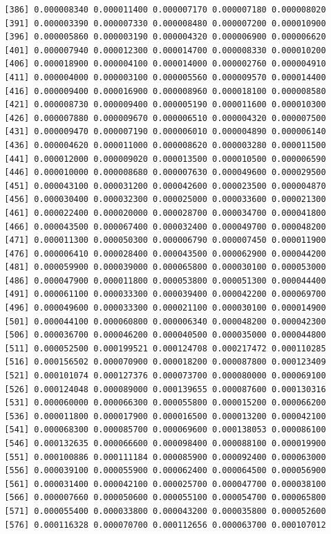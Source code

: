 \documentclass[]{article}
\begin{document}
\begin{verbatim}
  [386] 0.000008340 0.000011400 0.000007170 0.000007180 0.000008020
  [391] 0.000003390 0.000007330 0.000008480 0.000007200 0.000010900
  [396] 0.000005860 0.000003190 0.000004320 0.000006900 0.000006620
  [401] 0.000007940 0.000012300 0.000014700 0.000008330 0.000010200
  [406] 0.000018900 0.000004100 0.000014000 0.000002760 0.000004910
  [411] 0.000004000 0.000003100 0.000005560 0.000009570 0.000014400
  [416] 0.000009400 0.000016900 0.000008960 0.000018100 0.000008580
  [421] 0.000008730 0.000009400 0.000005190 0.000011600 0.000010300
  [426] 0.000007880 0.000009670 0.000006510 0.000004320 0.000007500
  [431] 0.000009470 0.000007190 0.000006010 0.000004890 0.000006140
  [436] 0.000004620 0.000011000 0.000008620 0.000003280 0.000011500
  [441] 0.000012000 0.000009020 0.000013500 0.000010500 0.000006590
  [446] 0.000010000 0.000008680 0.000007630 0.000049600 0.000029500
  [451] 0.000043100 0.000031200 0.000042600 0.000023500 0.000004870
  [456] 0.000030400 0.000032300 0.000025000 0.000033600 0.000021300
  [461] 0.000022400 0.000020000 0.000028700 0.000034700 0.000041800
  [466] 0.000043500 0.000067400 0.000032400 0.000049700 0.000048200
  [471] 0.000011300 0.000050300 0.000006790 0.000007450 0.000011900
  [476] 0.000006410 0.000028400 0.000043500 0.000062900 0.000044200
  [481] 0.000059900 0.000039000 0.000065800 0.000030100 0.000053000
  [486] 0.000047900 0.000011800 0.000053800 0.000051300 0.000044400
  [491] 0.000061100 0.000033300 0.000039400 0.000042200 0.000069700
  [496] 0.000049600 0.000033300 0.000021100 0.000030100 0.000014900
  [501] 0.000044100 0.000060800 0.000006340 0.000048200 0.000042300
  [506] 0.000036700 0.000046200 0.000040500 0.000035000 0.000044800
  [511] 0.000052500 0.000199521 0.000124708 0.000217472 0.000110285
  [516] 0.000156502 0.000070900 0.000018200 0.000087800 0.000123409
  [521] 0.000101074 0.000127376 0.000073700 0.000080000 0.000069100
  [526] 0.000124048 0.000089000 0.000139655 0.000087600 0.000130316
  [531] 0.000060000 0.000066300 0.000055800 0.000015200 0.000066200
  [536] 0.000011800 0.000017900 0.000016500 0.000013200 0.000042100
  [541] 0.000068300 0.000085700 0.000069600 0.000138053 0.000086100
  [546] 0.000132635 0.000066600 0.000098400 0.000088100 0.000019900
  [551] 0.000100886 0.000111184 0.000085900 0.000092400 0.000063000
  [556] 0.000039100 0.000055900 0.000062400 0.000064500 0.000056900
  [561] 0.000031400 0.000042100 0.000025700 0.000047700 0.000038100
  [566] 0.000007660 0.000050600 0.000055100 0.000054700 0.000065800
  [571] 0.000055400 0.000033800 0.000043200 0.000035800 0.000052600
  [576] 0.000116328 0.000070700 0.000112656 0.000063700 0.000107012

\end{verbatim}
\end{document}
